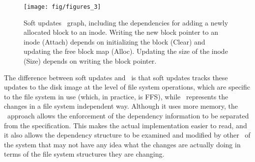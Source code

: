 \begin{figure}[htb]
  \centering
  \texttt{[image: fig/figures\_3]}
  \caption{\label{fig:softupdate} Soft updates \chdesc\ graph,
  including the dependencies for adding a newly allocated block to an
  inode. Writing the new block pointer to an inode (Attach) depends on
  initializing the block (Clear) and updating the free block map (Alloc).
  Updating the size of the inode (Size) depends on writing the block
  pointer.}
\end{figure}

The difference between soft updates and \Kudos\ is that soft updates tracks
these updates to the disk image at the level of file system operations, which
are specific to the file system in use (which, in practice, is FFS), while
\Kudos\ represents the changes in a file system independent way. Although it
uses more memory, the \Kudos\ approach allows the enforcement of the dependency
information to be separated from the specification. This makes the actual
implementation easier to read, and it also allows the dependency structure to be
examined and modified by other \modules\ of the system that may not have any
idea what the changes are actually doing in terms of the file system structures
they are changing.
